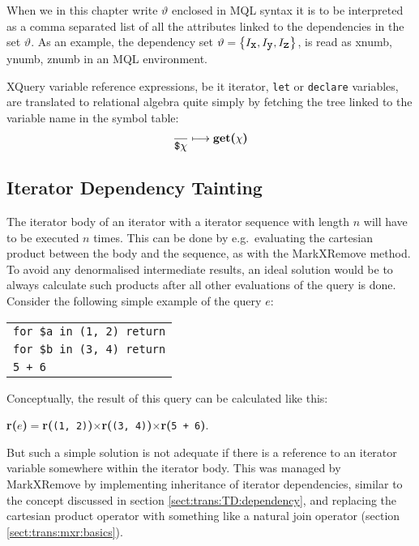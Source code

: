 When we in this chapter write $\vartheta$ enclosed in MQL syntax it is to be
interpreted as a comma separated list of all the attributes linked to the
dependencies in the set $\vartheta$. As an example, the dependency set
$\vartheta = \left\{I_{\mbox{\texttt{x}}},I_{\mbox{\texttt{y}}},I_{\mbox{\texttt{z}}}\right\}$, is read as
\textsf{xnumb, ynumb, znumb} in an MQL environment.

XQuery variable reference expressions, be it iterator, \texttt{let} or \texttt{declare} variables, are translated
to relational algebra quite simply by fetching the tree linked to the variable name in the symbol table:
\begin{equation}
\frac{}{\mbox{\texttt{\$}}\chi}\longmapsto
\mbox{\textbf{get(}}\chi\mbox{\textbf{)}}
\label{rule:trans:TD:varRef}
\end{equation}


\subsection{Iterator Dependency Tainting}
\label{sect:trans:TD:tainting}

The iterator body of an iterator with a iterator sequence with length $n$ will
have to be executed $n$ times. This can be done by e.g.\ evaluating the cartesian product between the body and the
sequence, as with the MarkXRemove method. To avoid any denormalised intermediate results, an ideal solution would be to
always calculate such products after all other evaluations of the query is
done. Consider the following simple example of the query $e$:

\begin{center}
\begin{tabular}{l}
\texttt{for \$a in (1, 2) return} \\ \qquad
\texttt{for \$b in (3, 4) return} \\ \qquad \qquad
\texttt{5 + 6}
\end{tabular}
\end{center}

Conceptually, the result of this query can be calculated like this:
\noindent
\begin{center}
\textbf{r(}$e$\textbf{)}$=$\textbf{r(}\texttt{(1, 2)}\textbf{)}$\times$\textbf{r(}\texttt{(3,
4)}\textbf{)}$\times$\textbf{r(}\texttt{5 + 6}\textbf{)}.
\end{center}
\noindent

But such a simple solution is not adequate if there is a reference to an iterator variable somewhere within the
iterator body. This was managed by MarkXRemove by implementing inheritance of iterator dependencies, similar to
the concept discussed in section \ref{sect:trans:TD:dependency}, and replacing the cartesian product operator with
something like a natural join operator (section \ref{sect:trans:mxr:basics}).

